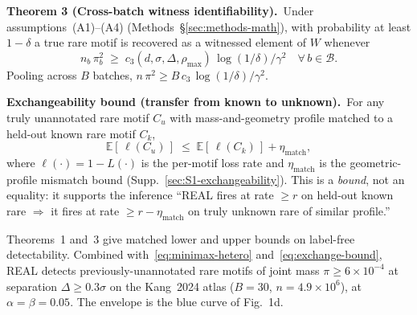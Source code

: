 \medskip\noindent\textbf{Theorem 3 (Cross-batch witness identifiability).}\
Under assumptions~(A1)--(A4) (Methods~\S\ref{sec:methods-math}), with probability at least $1-\delta$ a true rare motif is recovered as a witnessed element of $W$ whenever
\begin{equation}
  n_{b}\,\pi_{b}^{2} \;\geq\; c_{3}(d,\sigma,\Delta,\rho_{\max})\,\log(1/\delta)/\gamma^{2}
  \quad \forall\,b\in\mathcal{B}.
\end{equation}
Pooling across $B$ batches, $n\,\pi^{2} \geq B\,c_{3}\,\log(1/\delta)/\gamma^{2}$.

\medskip\noindent\textbf{Exchangeability bound (transfer from known to unknown).}\
For any truly unannotated rare motif $C_{u}$ with mass-and-geometry profile matched to a held-out known rare motif $C_{k}$,
\begin{equation}
  \mathbb{E}\!\left[\,\ell(C_{u})\,\right]
  \;\leq\;
  \mathbb{E}\!\left[\,\ell(C_{k})\,\right]
  + \eta_{\mathrm{match}},
  \label{eq:exchange-bound}
\end{equation}
where $\ell(\cdot)=1-L(\cdot)$ is the per-motif loss rate and $\eta_{\mathrm{match}}$ is the geometric-profile mismatch bound (Supp.~\ref{sec:S1-exchangeability}). This is a \emph{bound}, not an equality: it supports the inference ``REAL fires at rate $\geq r$ on held-out known rare $\Rightarrow$ it fires at rate $\geq r-\eta_{\mathrm{match}}$ on truly unknown rare of similar profile.''

\medskip\noindent
Theorems~1 and~3 give matched lower and upper bounds on label-free detectability. Combined with~\eqref{eq:minimax-hetero} and~\eqref{eq:exchange-bound}, REAL detects previously-unannotated rare motifs of joint mass $\pi\geq 6\times 10^{-4}$ at separation $\Delta\geq 0.3\sigma$ on the Kang~2024 atlas ($B=30$, $n=4.9\times 10^{6}$), at $\alpha=\beta=0.05$. The envelope is the blue curve of Fig.~1d.
